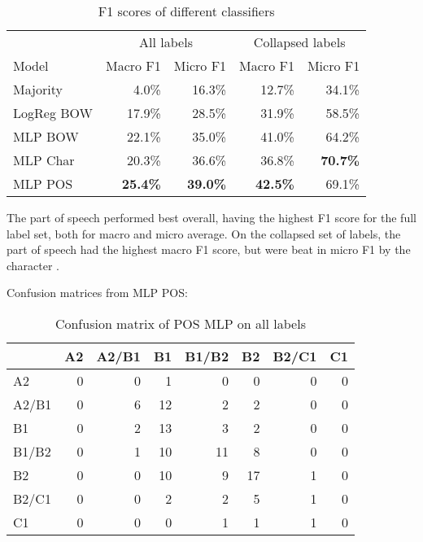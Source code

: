 \begin{table}
  \centering
  \begin{tabular}{|l|rr|rr|}
    \toprule
             & \multicolumn{2}{c|}{All labels} & \multicolumn{2}{c|}{Collapsed labels} \\
    Model      & Macro F1        & Micro F1        & Macro F1        & Micro F1       \\
    \midrule
    Majority   &          4.0\%  &         16.3\%  &         12.7\%  &         34.1\% \\
    LogReg BOW &         17.9\%  &         28.5\%  &         31.9\%  &         58.5\% \\
    MLP BOW    &         22.1\%  &         35.0\%  &         41.0\%  &         64.2\% \\
    MLP Char   &         20.3\%  &         36.6\%  &         36.8\%  & \textbf{70.7\%} \\
    MLP POS    & \textbf{25.4\%} & \textbf{39.0\%} & \textbf{42.5\%} &         69.1\% \\
    \bottomrule
  \end{tabular}
  \caption{F1 scores of different classifiers}
  \label{baseline-accuracies}
\end{table}

The part of speech \ngrams performed best overall, having the highest F1 score
for the full label set, both for macro and micro average. On the collapsed set
of labels, the part of speech \ngrams had the highest macro F1 score, but were
beat in micro F1 by the character \ngrams.

Confusion matrices from MLP POS:

\begin{table}
  \centering
  \begin{tabular}{|l|rrrrrrr|}
    \toprule
          & A2 & A2/B1 & B1 & B1/B2 & B2 & B2/C1 & C1 \\
    \midrule
    A2    &  0 &     0 &  1 &     0 &  0 &     0 &  0 \\
    A2/B1 &  0 &     6 & 12 &     2 &  2 &     0 &  0 \\
    B1    &  0 &     2 & 13 &     3 &  2 &     0 &  0 \\
    B1/B2 &  0 &     1 & 10 &    11 &  8 &     0 &  0 \\
    B2    &  0 &     0 & 10 &     9 & 17 &     1 &  0 \\
    B2/C1 &  0 &     0 &  2 &     2 &  5 &     1 &  0 \\
    C1    &  0 &     0 &  0 &     1 &  1 &     1 &  0 \\
    \bottomrule
  \end{tabular}
  \caption{Confusion matrix of POS MLP on all labels}
  \label{confusion-full}
\end{table}

